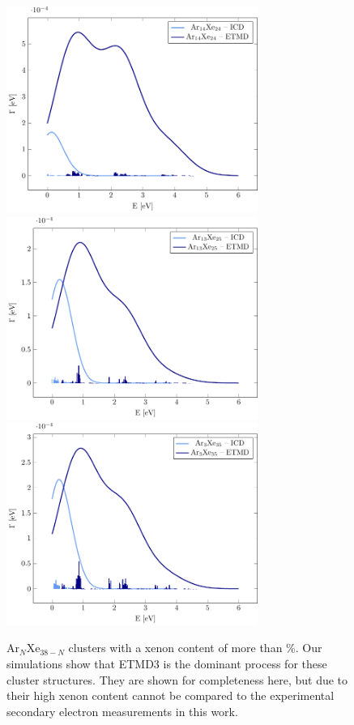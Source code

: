 \begin{figure}
 \centering
 \includegraphics[width=8.2cm]{pics/Ar14Xe24.pdf}
 \includegraphics[width=8.2cm]{pics/Ar13Xe25.pdf}
 \includegraphics[width=8.2cm]{pics/Ar3Xe35.pdf}
 \caption{Ar$_N$Xe$_{38-N}$ clusters with a xenon content of more
          than \unit[50]{\%}.
          Our simulations show that ETMD3 is the dominant process
          for these cluster structures.
          They are shown for completeness here, but due to their high xenon
          content cannot be compared to the experimental 
          secondary electron measurements in this work.}
 \label{figure:ArXe_gt50}
\end{figure}


